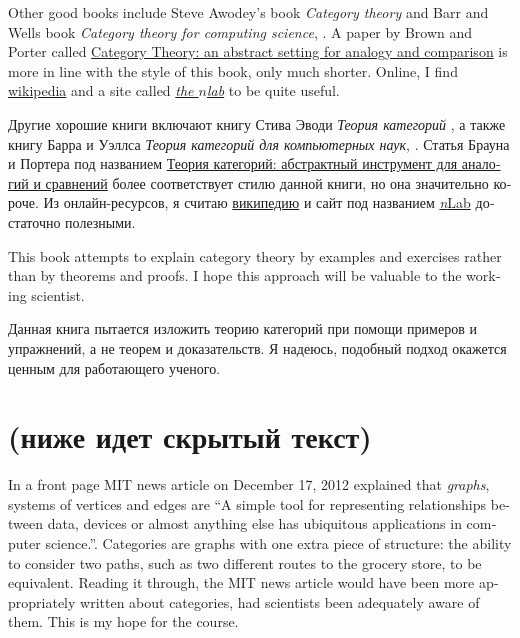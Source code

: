 \documentclass{book}
\theoremstyle{theoremENG}
\theoremstyle{lemmaENG}
\theoremstyle{propositionENG}
\theoremstyle{corollaryENG}
\theoremstyle{factENG}
\theoremstyle{remarkENG}
\theoremstyle{exampleENG}
\theoremstyle{warningENG}
\theoremstyle{questionENG}
\theoremstyle{guessENG}
\theoremstyle{answerENG}
\theoremstyle{constructionENG}
\theoremstyle{rulesENG}
\theoremstyle{excENG}
\theoremstyle{appENG}
\theoremstyle{definitionENG}
\theoremstyle{notationENG}
\theoremstyle{conjectureENG}
\theoremstyle{postulateENG}
\theoremstyle{theoremRUS}
\theoremstyle{lemmaRUS}
\theoremstyle{propositionRUS}
\theoremstyle{corollaryRUS}
\theoremstyle{factRUS}
\theoremstyle{remarkRUS}
\theoremstyle{exampleRUS}
\theoremstyle{warningRUS}
\theoremstyle{questionRUS}
\theoremstyle{guessRUS}
\theoremstyle{answerRUS}
\theoremstyle{constructionRUS}
\theoremstyle{rulesRUS}
\theoremstyle{excRUS}
\theoremstyle{appRUS}
\theoremstyle{definitionRUS}
\theoremstyle{notationRUS}
\theoremstyle{conjectureRUS}
\theoremstyle{postulateRUS}
\begin{document}
\begin{english}
Other good books include Steve Awodey's book {\em Category theory} \cite{Awo} and Barr and Wells book {\em Category theory for computing science}, \cite{BW}.  A paper by Brown and Porter called  \href{http://pages.bangor.ac.uk/\%7Emas010/pdffiles/Analogy-and-Comparison.pdf}{\text Category Theory: an abstract setting for analogy and comparison} \cite{BP1} is more in line with the style of this book, only much shorter. Online, I find \href{http://www.wikipedia.org}{\text wikipedia} and a site called \href{http://ncatlab.org/nlab/show/HomePage}{\em the $n$lab} to be quite useful.

\begin{russian}Другие хорошие книги включают книгу Стива Эводи {\em Теория категорий} \cite{Awo}, а также книгу Барра и Уэллса {\em Теория категорий для компьютерных наук}, \cite{BW}. Статья Брауна и Портера под названием  \href{http://pages.bangor.ac.uk/\%7Emas010/pdffiles/Analogy-and-Comparison.pdf}{\text Теория категорий: абстрактный инструмент для аналогий и сравнений} \cite{BP1} более соответствует стилю данной книги, но она значительно короче. Из онлайн-ресурсов, я считаю \href{http://www.wikipedia.org}{\text википедию} и сайт под названием \href{http://ncatlab.org/nlab/show/HomePage}{{\em{n}}Lab} достаточно полезными. \end{russian}

This book attempts to explain category theory by examples and exercises rather than by theorems and proofs. I hope this approach will be valuable to the working scientist.

\begin{russian}Данная книга пытается изложить теорию категорий при помощи примеров и упражнений, а не теорем и доказательств. Я надеюсь, подобный подход окажется ценным для работающего ученого. \end{russian}


\section{(ниже идет скрытый текст)}

In a front page MIT news article on December 17, 2012 explained that {\em graphs}, systems of vertices and edges are “A simple tool for representing relationships between data, devices or almost anything else has ubiquitous applications in computer science.”\cite{http://web.mit.edu/newsoffice/2012/explained-graphs-computer-science-1217.html}. Categories are graphs with one extra piece of structure: the ability to consider two paths, such as two different routes to the grocery store, to be equivalent. Reading it through, the MIT news article would have been more appropriately written about categories, had scientists been adequately aware of them. This is my hope for the course.


\end{english}
\end{document}
